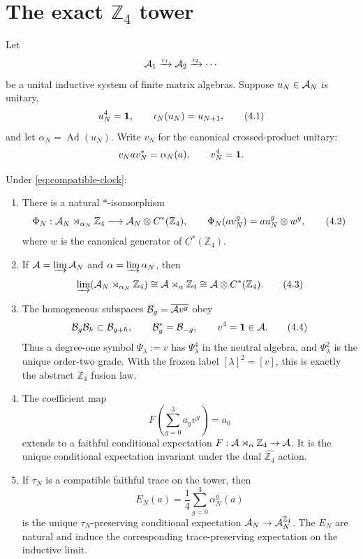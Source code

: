 \section{The exact \texorpdfstring{$\mathbb Z_4$}{Z4} tower}
\label{sec:tower}

Let
\[
 \mathcal A_1\xrightarrow{\iota_1}\mathcal A_2\xrightarrow{\iota_2}\cdots
\]
be a unital inductive system of finite matrix algebras.  Suppose
$u_N\in\mathcal A_N$ is unitary,
\[
 u_N^4=\mathbf 1,\qquad \iota_N(u_N)=u_{N+1},
\tag{4.1}\label{eq:compatible-clock}
\]
and let $\alpha_N=\operatorname{Ad}(u_N)$.
Write $v_N$ for the canonical crossed-product unitary:
\[
 v_Nav_N^*=\alpha_N(a),\qquad v_N^4=\mathbf 1.
\]

\begin{theorem}
\label{thm:crossed}
Under \eqref{eq:compatible-clock}:
\begin{enumerate}[label=\textup{(\alph*)}]
\item There is a natural $*$-isomorphism
\[
 \Phi_N:\mathcal A_N\rtimes_{\alpha_N}\mathbb Z_4
 \longrightarrow
 \mathcal A_N\otimes C^*(\mathbb Z_4),
\qquad
 \Phi_N(av_N^g)=au_N^g\otimes w^g,
\tag{4.2}\label{eq:phi}
\]
where $w$ is the canonical generator of $C^*(\mathbb Z_4)$.
\item If $\mathcal A=\varinjlim\mathcal A_N$ and $\alpha=\varinjlim\alpha_N$, then
\[
 \varinjlim(\mathcal A_N\rtimes_{\alpha_N}\mathbb Z_4)
 \cong\mathcal A\rtimes_\alpha\mathbb Z_4
 \cong\mathcal A\otimes C^*(\mathbb Z_4).
\tag{4.3}\label{eq:limit-crossed}
\]
\item The homogeneous subspaces
$\mathcal B_g=\overline{\mathcal A v^g}$ obey
\[
 \mathcal B_g\mathcal B_h\subset\mathcal B_{g+h},
\qquad
\mathcal B_g^*=\mathcal B_{-g},
\qquad
v^4=\mathbf 1\in\mathcal A.
\tag{4.4}\label{eq:fusion}
\]
Thus a degree-one symbol $\Psi_\lambda:=v$ has
$\Psi_\lambda^4$ in the neutral algebra, and
$\Psi_\lambda^2$ is the unique order-two grade.  With the frozen label
$[\lambda]^2=[v]$, this is exactly the abstract $\mathbb Z_4$ fusion
law.
\item The coefficient map
\[
 F\left(\sum_{g=0}^3a_gv^g\right)=a_0
\tag{4.5}\label{eq:coefficient-expectation}
\]
extends to a faithful conditional expectation
$F:\mathcal A\rtimes_\alpha\mathbb Z_4\to\mathcal A$.  It is the unique conditional
expectation invariant under the dual $\widehat{\mathbb Z_4}$ action.
\item If $\tau_N$ is a compatible faithful trace on the tower, then
\[
 E_N(a)=\frac14\sum_{g=0}^3\alpha_N^g(a)
\tag{4.6}\label{eq:average-expectation}
\]
is the unique $\tau_N$-preserving conditional expectation
$\mathcal A_N\to\mathcal A_N^{\mathbb Z_4}$.  The $E_N$ are natural and induce the
corresponding trace-preserving expectation on the inductive limit.
\end{enumerate}
\end{theorem}

